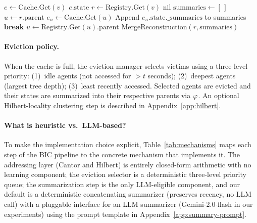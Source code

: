 \begin{algorithm}[t]
\caption{\textsc{Query}$(v)$ — retrieve agent $v$'s state.}
\label{alg:query}
\begin{algorithmic}[1]
  \STATE $e \gets \mathrm{Cache.Get}(v)$
    \RETURN $e.\mathrm{state}$
  \ENDIF
  \STATE $r \gets \mathrm{Registry.Get}(v)$
    \RETURN nil
  \ENDIF
  \STATE {}
  \STATE $\mathrm{summaries} \gets [\,]$
  \STATE $u \gets r.\mathrm{parent}$
    \STATE $e_u \gets \mathrm{Cache.Get}(u)$
      \STATE Append $e_u.\mathrm{state.\_summaries}$ to summaries
      \STATE \textbf{break}
    \ENDIF
    \STATE $u \gets \mathrm{Registry.Get}(u).\mathrm{parent}$
  \ENDWHILE
  \RETURN $\mathrm{MergeReconstruction}(r, \mathrm{summaries})$
\end{algorithmic}
\end{algorithm}

\paragraph{Eviction policy.}
When the cache is full, the eviction manager selects victims using a
three-level priority: (1)~idle agents (not accessed for $>t$ seconds);
(2)~deepest agents (largest tree depth); (3)~least recently accessed.
Selected agents are evicted and their states are summarized into their
respective parents via $\varphi$.  An optional Hilbert-locality
clustering step is described in Appendix~\ref{app:hilbert}.

\paragraph{What is heuristic vs.\ LLM-based?}
To make the implementation choice explicit, Table~\ref{tab:mechanisms}
maps each step of the BIC pipeline to the concrete mechanism that
implements it.  The addressing layer (Cantor and Hilbert) is entirely
closed-form arithmetic with no learning component; the eviction
selector is a deterministic three-level priority queue; the
summarization step is the only LLM-eligible component, and our
default is a deterministic concatenating summarizer (preserves
recency, no LLM call) with a pluggable interface for an LLM
summarizer (Gemini-2.0-flash in our experiments) using the prompt
template in Appendix~\ref{app:summary-prompt}.

